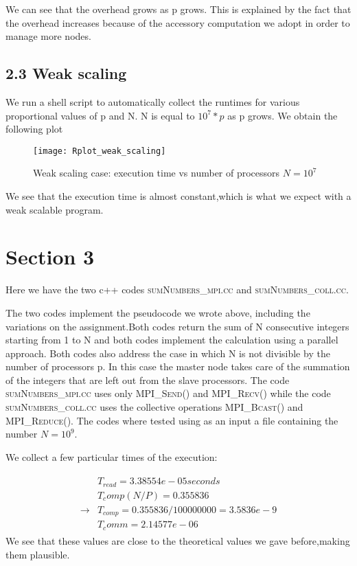 \documentclass[11pt]{scrartcl} %
\begin{document}
We can see that the overhead grows as p grows. This is explained by the fact that the overhead increases because of the accessory computation we adopt in order to manage more nodes.
\subsection{2.3 Weak scaling}

We run a shell script to automatically collect the runtimes for various proportional values of p and N. N is equal to $10^7*p$ as p grows.
We obtain the following plot
\begin{figure}[H] %
	\centering
	\texttt{[image: Rplot\_weak\_scaling]} %
	\caption{Weak scaling case: execution time vs number of processors $N= 10^7$}
\end{figure}
We see that the execution time is almost constant,which is what we expect with a weak scalable program.
\section{Section 3}
Here we have the two c++ codes \textsc{sumNumbers\_mpi.cc} and \textsc{sumNumbers\_coll.cc}.

The two codes implement the pseudocode we wrote above, including the variations on the assignment.Both codes return the sum of N consecutive integers starting from 1 to N and both codes implement the calculation using a parallel approach. Both codes also address the case in which N is not divisible by the number of processors p. In this case the master node takes care of the summation of the integers that are left out from the slave processors.
The code \textsc{sumNumbers\_mpi.cc} uses only \textsc{MPI\_Send()} and \textsc{MPI\_Recv()}
while the code \textsc{sumNumbers\_coll.cc} uses the collective operations \textsc{MPI\_Bcast()} and \textsc{MPI\_Reduce()}. The codes where tested using as an input a file containing the number $N = 10^9$.

We collect a few particular times of the execution:

\begin{align} 
	\begin{split}
		&T_{read}= 3.38554 e-05 seconds\\
		&T_comp (N/P)= 0.355836\\
		\rightarrow &T_{comp} = 0.355836/100000000 = 3.5836e-9\\
		&T_comm=2.14577e-06
	\end{split}					
\end{align}
 We see that these values are close to the theoretical values we gave before,making them plausible.
\end{document}
